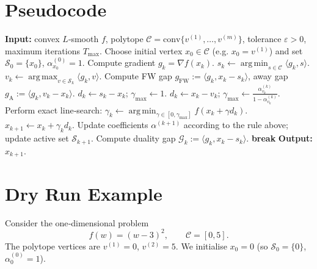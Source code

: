 \documentclass{article}
\newcommand{\gap}{\mathcal{G}}
\newcommand{\conv}{\mathrm{conv}}
\newcommand{\argmin}{\operatorname*{arg\,min}}
\newcommand{\argmax}{\operatorname*{arg\,max}}
\begin{document}
\section*{Pseudocode}
\begin{algorithm}[H]
\caption{Away‑Step Frank–Wolfe (AFW)}
\begin{algorithmic}[1]
\STATE \textbf{Input:} convex $L$‑smooth $f$, polytope $\mathcal{C}=\conv\{v^{(1)},\dots ,v^{(m)}\}$,
tolerance $\varepsilon>0$, maximum iterations $T_{\max}$.
\STATE Choose initial vertex $x_0\in\mathcal{C}$ (e.g. $x_0=v^{(1)}$) and set $\mathcal{S}_0=\{x_0\}$, $\alpha^{(0)}_{x_0}=1$.
    \STATE Compute gradient $g_k=\nabla f(x_k)$.
    \STATE $s_k \gets \argmin_{s\in\mathcal{C}}\langle g_k,s\rangle$.
    \STATE $v_k \gets \argmax_{v\in\mathcal{S}_k}\langle g_k,v\rangle$.
    \STATE Compute FW gap $g_{\text{FW}}:=\langle g_k,x_k-s_k\rangle$, away gap $g_{\text{A}}:=\langle g_k,v_k-x_k\rangle$.
        \STATE $d_k \gets s_k-x_k$; $\gamma_{\max}\gets 1$.
    \ELSE
        \STATE $d_k \gets x_k-v_k$; $\gamma_{\max}\gets \frac{\alpha^{(k)}_{v_k}}{1-\alpha^{(k)}_{v_k}}$.
    \ENDIF
    \STATE Perform exact line‑search: $\displaystyle\gamma_k\gets\argmin_{\gamma\in[0,\gamma_{\max}]} f(x_k+\gamma d_k)$.
    \STATE $x_{k+1}\gets x_k+\gamma_k d_k$.
    \STATE Update coefficients $\alpha^{(k+1)}$ according to the rule above; update active set $\mathcal{S}_{k+1}$.
    \STATE Compute duality gap $\gap_k:=\langle g_k,x_k-s_k\rangle$.
    \IF{$\gap_k\le\varepsilon$}
        \STATE \textbf{break}
    \ENDIF
\ENDFOR
\STATE \textbf{Output:} $x_{k+1}$.
\end{algorithmic}
\end{algorithm}

\section*{Dry Run Example}
Consider the one‑dimensional problem
\[
f(w)=(w-3)^2,\qquad \mathcal{C}=[0,5].
\]
The polytope vertices are $v^{(1)}=0$, $v^{(2)}=5$.  
We initialise $x_0=0$ (so $\mathcal{S}_0=\{0\}$, $\alpha^{(0)}_0=1$).  
\end{document}
